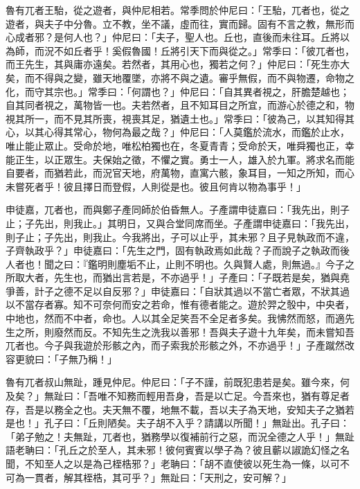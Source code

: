 
\begin{pinyinscope}
魯有兀者王駘，從之遊者，與仲尼相若。常季問於仲尼曰：「王駘，兀者也，從之遊者，與夫子中分魯。立不教，坐不議，虛而往，實而歸。固有不言之教，無形而心成者邪？是何人也？」仲尼曰：「夫子，聖人也。丘也，直後而未往耳。丘將以為師，而況不如丘者乎！奚假魯國！丘將引天下而與從之。」常季曰：「彼兀者也，而王先生，其與庸亦遠矣。若然者，其用心也，獨若之何？」仲尼曰：「死生亦大矣，而不得與之變，雖天地覆墜，亦將不與之遺。審乎無假，而不與物遷，命物之化，而守其宗也。」常季曰：「何謂也？」仲尼曰：「自其異者視之，肝膽楚越也；自其同者視之，萬物皆一也。夫若然者，且不知耳目之所宜，而游心於德之和，物視其所一，而不見其所喪，視喪其足，猶遺土也。」常季曰：「彼為己，以其知得其心，以其心得其常心，物何為最之哉？」仲尼曰：「人莫鑑於流水，而鑑於止水，唯止能止眾止。受命於地，唯松柏獨也在，冬夏青青；受命於天，唯舜獨也正，幸能正生，以正眾生。夫保始之徵，不懼之實。勇士一人，雄入於九軍。將求名而能自要者，而猶若此，而況官天地，府萬物，直寓六骸，象耳目，一知之所知，而心未嘗死者乎！彼且擇日而登假，人則從是也。彼且何肯以物為事乎！」

申徒嘉，兀者也，而與鄭子產同師於伯昏無人。子產謂申徒嘉曰：「我先出，則子止；子先出，則我止。」其明日，又與合堂同席而坐。子產謂申徒嘉曰：「我先出，則子止；子先出，則我止。今我將出，子可以止乎，其未邪？且子見執政而不違，子齊執政乎？」申徒嘉曰：「先生之門，固有執政焉如此哉？子而說子之執政而後人者也！聞之曰：『鑑明則塵垢不止，止則不明也。久與賢人處，則無過。』今子之所取大者，先生也，而猶出言若是，不亦過乎！」子產曰：「子既若是矣，猶與堯爭善，計子之德不足以自反邪？」申徒嘉曰：「自狀其過以不當亡者眾，不狀其過以不當存者寡。知不可奈何而安之若命，惟有德者能之。遊於羿之彀中，中央者，中地也，然而不中者，命也。人以其全足笑吾不全足者多矣。我怫然而怒，而適先生之所，則廢然而反。不知先生之洗我以善邪！吾與夫子遊十九年矣，而未嘗知吾兀者也。今子與我遊於形骸之內，而子索我於形骸之外，不亦過乎！」子產蹴然改容更貌曰：「子無乃稱！」

魯有兀者叔山無趾，踵見仲尼。仲尼曰：「子不謹，前既犯患若是矣。雖今來，何及矣？」無趾曰：「吾唯不知務而輕用吾身，吾是以亡足。今吾來也，猶有尊足者存，吾是以務全之也。夫天無不覆，地無不載，吾以夫子為天地，安知夫子之猶若是也！」孔子曰：「丘則陋矣。夫子胡不入乎？請講以所聞！」無趾出。孔子曰：「弟子勉之！夫無趾，兀者也，猶務學以復補前行之惡，而況全德之人乎！」無趾語老聃曰：「孔丘之於至人，其未邪！彼何賓賓以學子為？彼且蘄以諔詭幻怪之名聞，不知至人之以是為己桎梏邪？」老聃曰：「胡不直使彼以死生為一條，以可不可為一貫者，解其桎梏，其可乎？」無趾曰：「天刑之，安可解？」


\end{pinyinscope}
